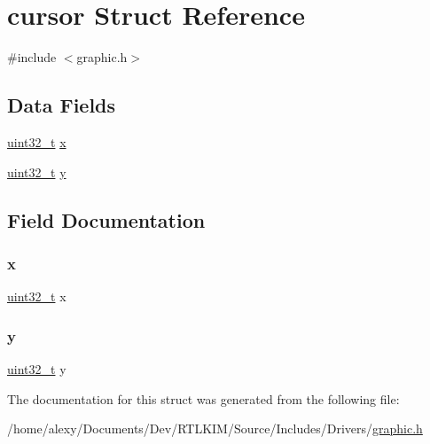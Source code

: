 \hypertarget{structcursor}{}\section{cursor Struct Reference}
\label{structcursor}


{\ttfamily \#include $<$graphic.\+h$>$}

\subsection*{Data Fields}
\begin{DoxyCompactItemize}
\item 
\hyperlink{stdint_8h_a324c5d28c0d82f502a234ab99efac87a}{uint32\+\_\+t} \hyperlink{structcursor_aae8a40a17c0be29c1f06ca6b4f9e2235}{x}
\item 
\hyperlink{stdint_8h_a324c5d28c0d82f502a234ab99efac87a}{uint32\+\_\+t} \hyperlink{structcursor_a9c02f93c9698e4486878867c4f265c48}{y}
\end{DoxyCompactItemize}


\subsection{Field Documentation}
\mbox{\label{structcursor_aae8a40a17c0be29c1f06ca6b4f9e2235}} 
\subsubsection{\texorpdfstring{x}{x}}
{\footnotesize\ttfamily \hyperlink{stdint_8h_a324c5d28c0d82f502a234ab99efac87a}{uint32\+\_\+t} x}

\mbox{\label{structcursor_a9c02f93c9698e4486878867c4f265c48}} 
\subsubsection{\texorpdfstring{y}{y}}
{\footnotesize\ttfamily \hyperlink{stdint_8h_a324c5d28c0d82f502a234ab99efac87a}{uint32\+\_\+t} y}



The documentation for this struct was generated from the following file\+:\begin{DoxyCompactItemize}
\item 
/home/alexy/\+Documents/\+Dev/\+R\+T\+L\+K\+I\+M/\+Source/\+Includes/\+Drivers/\hyperlink{graphic_8h}{graphic.\+h}\end{DoxyCompactItemize}
